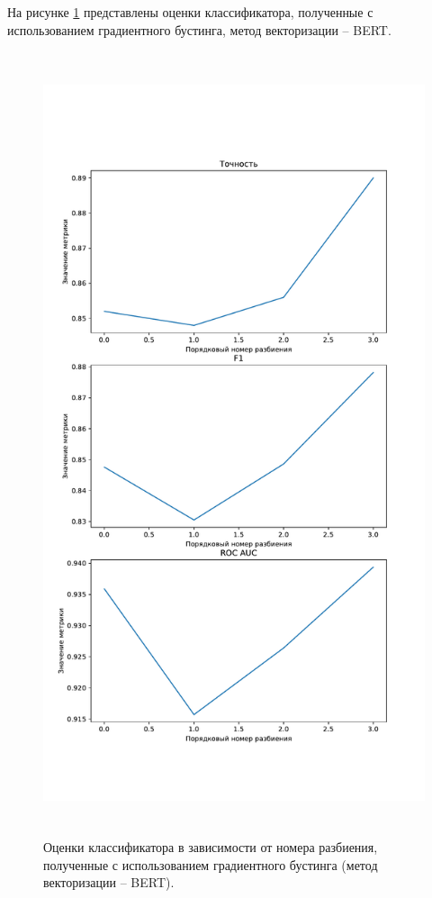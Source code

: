 На рисунке \ref{img:gradientMetricsBert} представлены оценки классификатора, полученные с использованием градиентного бустинга, метод векторизации -- BERT.
\begin{figure}[H]
	\centering
	\includegraphics[height=23cm]{inc/plots/gradientMetricsBert.pdf}
	\caption{ Оценки классификатора в зависимости от номера разбиения, полученные с использованием градиентного бустинга (метод векторизации -- BERT). }
	\label{img:gradientMetricsBert}
\end{figure}



